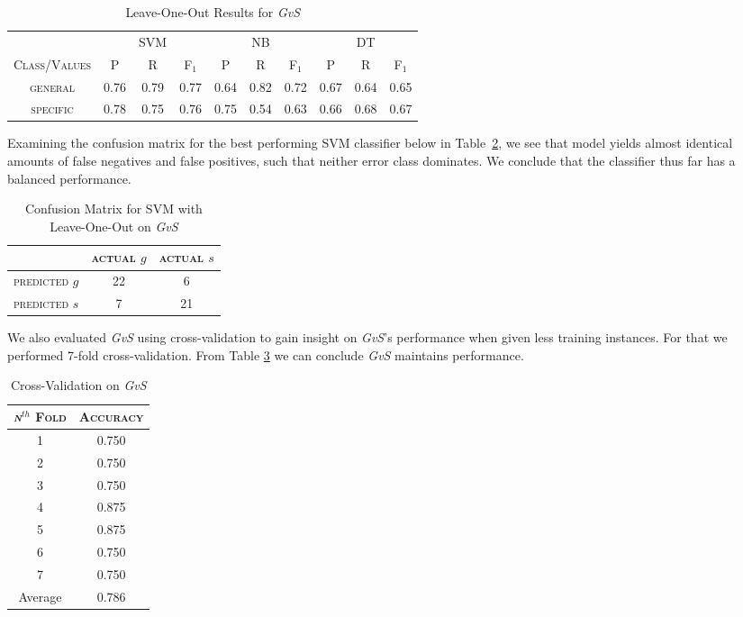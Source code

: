\begin{table}[h]
	\center
	\begin{tabular}{ c | c  c  c | c c c | c c c}
		& & SVM & & & NB & & & DT \\
		\textsc{Class/Values} & \textsc{P} & \textsc{R} & \textsc{F$_1$} & \textsc{P} & \textsc{R} & \textsc{F$_1$} & \textsc{P} & \textsc{R} & \textsc{F$_1$} \\
		\hline
		\textsc{general} 			& 0.76  &    0.79   &   0.77 & 0.64   &   0.82   &   0.72 & 0.67  &    0.64  &    0.65 \\
		\textsc{specific} 			& 0.78  &    0.75   &   0.76 & 0.75   &   0.54   &   0.63 & 0.66  &    0.68  &    0.67 \\
	\end{tabular}
	\caption{Leave-One-Out Results for {\it GvS}}
	\label{tab:firsttieresults}
\end{table}

Examining the confusion matrix for the best performing SVM classifier below in Table~\ref{tab:firstsvmconfusionmatrix}, we see that model yields almost identical amounts of false negatives and false positives, such that neither error class dominates.  We conclude that the classifier thus far has a balanced performance.

\begin{table}[h]
	\center
	\begin{tabular}{ c | c  c }
		 & \textsc{actual $g$} & \textsc{actual $s$} \\
		\hline
		\textsc{predicted $g$} 	& 22 & 6 \\
		\textsc{predicted $s$}		& 7 & 21
	\end{tabular}
	\caption{Confusion Matrix for SVM with Leave-One-Out on {\it GvS}}
	\label{tab:firstsvmconfusionmatrix}
\end{table}

We also evaluated {\it GvS} using cross-validation to gain insight on {\it GvS}'s performance when given less training instances. For that we performed 7-fold cross-validation. From Table \ref{tab:crossvalidation} we can conclude {\it GvS} maintains performance.

\begin{table}[h]
	\singlespacingplus
	\center
	\begin{tabular}{ c c }
		\textsc{{\it n}$^{th}$ Fold} & \textsc{Accuracy} \\
		\hline
		1 & 0.750 \\
		2 & 0.750 \\
		3 & 0.750 \\
		4 & 0.875 \\
		5 & 0.875 \\
		6 & 0.750 \\
		7 & 0.750 \\
		Average & 0.786 \\
	\end{tabular}
	\caption{Cross-Validation on {\it GvS}}
	\label{tab:crossvalidation}
\end{table}

